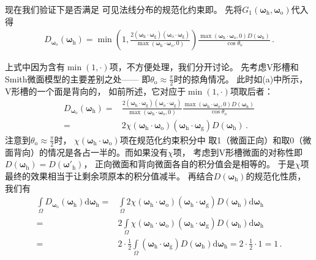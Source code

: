 现在我们验证下是否满足
可见法线分布的规范化约束即。
先将$G_1({\bm\omega}_{\mathrm{h}},{\bm\omega}_{\mathrm{o}})$代入得
\begin{align}
    D_{{\bm\omega}_{\mathrm{o}}}({\bm\omega}_{\mathrm{h}})
    =\min\left(1, \frac{2({\bm\omega}_{\mathrm{h}}\cdot{\bm\omega}_{\mathrm{g}})
    ({\bm\omega}_{\mathrm{o}}\cdot{\bm\omega}_{\mathrm{g}})}
    {\max({\bm\omega}_{\mathrm{h}}\cdot{\bm\omega}_{\mathrm{o}},0)}\right)
    \frac{\max({\bm\omega}_{\mathrm{h}}\cdot{\bm\omega}_{\mathrm{o}},0)
        D({\bm\omega}_{\mathrm{h}})}{\cos\theta_{\mathrm{o}}}\, .
\end{align}

上式中因为含有$\min(1,\cdot)$项，不方便处理，我们分开讨论。
先考虑V形槽和Smith微面模型的主要差别之处——
即$\displaystyle\theta_{\mathrm{o}}\approx\frac{\pi}{2}$时的掠角情况。
此时如(a)中所示，V形槽的一个面是背向的，
如前所述，它对应于$\min(1,\cdot)$项取后者：
\begin{align}
    D_{{\bm\omega}_{\mathrm{o}}}({\bm\omega}_{\mathrm{h}})
    = & \frac{2({\bm\omega}_{\mathrm{h}}\cdot{\bm\omega}_{\mathrm{g}})
    ({\bm\omega}_{\mathrm{o}}\cdot{\bm\omega}_{\mathrm{g}})}
    {\max({\bm\omega}_{\mathrm{h}}\cdot{\bm\omega}_{\mathrm{o}},0)}
    \frac{\max({\bm\omega}_{\mathrm{h}}\cdot{\bm\omega}_{\mathrm{o}},0)
        D({\bm\omega}_{\mathrm{h}})}{\cos\theta_{\mathrm{o}}}\nonumber \\
    = & 2\chi({\bm\omega}_{\mathrm{h}}\cdot{\bm\omega}_{\mathrm{o}})
    ({\bm\omega}_{\mathrm{h}}\cdot{\bm\omega}_{\mathrm{g}})
    D({\bm\omega}_{\mathrm{h}})\, .
\end{align}
注意到$\displaystyle\theta_{\mathrm{o}}\approx\frac{\pi}{2}$时，
$\chi({\bm\omega}_{\mathrm{h}}\cdot{\bm\omega}_{\mathrm{o}})$项在规范化约束积分中
取1（微面正向）和取0（微面背向）的情况是各占一半的。而如果没有$\chi$项，
考虑到V形槽微面的对称性即$D({\bm\omega}_{\mathrm{h}})=D({\bm\omega}'_{\mathrm{h}})$，
正向微面和背向微面各自的积分值会是相等的。
于是$\chi$项最终的效果相当于让剩余项原本的积分值减半。
再结合$D({\bm\omega}_{\mathrm{h}})$的规范化性质，
我们有
\begin{align}
    \int\limits_{\varOmega}D_{{\bm\omega}_{\mathrm{o}}}({\bm\omega}_{\mathrm{h}})
    \mathrm{d}{\bm\omega}_{\mathrm{h}}
    = & \int\limits_{\varOmega}2\chi({\bm\omega}_{\mathrm{h}}\cdot{\bm\omega}_{\mathrm{o}})
    ({\bm\omega}_{\mathrm{h}}\cdot{\bm\omega}_{\mathrm{g}})
    D({\bm\omega}_{\mathrm{h}})\mathrm{d}{\bm\omega}_{\mathrm{h}}\nonumber                              \\
    = & 2\int\limits_{\varOmega}\chi({\bm\omega}_{\mathrm{h}}\cdot{\bm\omega}_{\mathrm{o}})
    ({\bm\omega}_{\mathrm{h}}\cdot{\bm\omega}_{\mathrm{g}})
    D({\bm\omega}_{\mathrm{h}})\mathrm{d}{\bm\omega}_{\mathrm{h}}\nonumber                              \\
    = & 2\cdot\frac{1}{2}\int\limits_{\varOmega}({\bm\omega}_{\mathrm{h}}\cdot{\bm\omega}_{\mathrm{g}})
    D({\bm\omega}_{\mathrm{h}})\mathrm{d}{\bm\omega}_{\mathrm{h}}=2\cdot\frac{1}{2}\cdot1=1\, .
\end{align}

